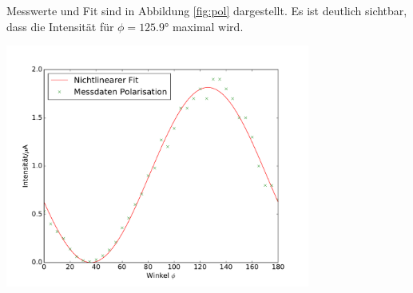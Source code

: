 \documentclass[captions=tableheading]{scrartcl}
\begin{document}
Messwerte und Fit sind in Abbildung \ref{fig:pol} dargestellt. Es ist deutlich sichtbar, dass die Intensität für $\phi=\ang{125.9}$ maximal wird.
\begin{center}
 	\includegraphics[width=10cm]{images/polarisation.pdf}
 	\label{fig:pol}
\end{center}
\end{document}
